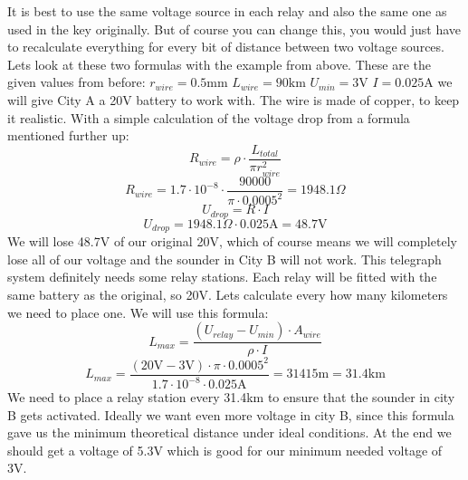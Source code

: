 It is best to use the same voltage source in each relay and also the same one as used in the key originally. But of course you can change this, you would just have to recalculate everything for every bit of distance between two voltage sources.
Lets look at these two formulas with the example from above. These are the given values from before:
$r_{wire} = 0.5\text{mm}$
$L_{wire} = 90\text{km}$
$U_{min} = 3\text{V}$
$I = 0.025 \text{A}$
we will give City A a 20V battery to work with. The wire is made of copper, to keep it realistic.
With a simple calculation of the voltage drop from a formula mentioned further up:
\[
R_{wire} = \rho \cdot \frac{L_{total}}{\pi r_{wire}^2}
\]
\[
R_{wire} = 1.7\cdot 10^{-8} \cdot \frac{90000}{\pi \cdot 0.0005^2} = 1948.1 \Omega 
\]
\[
U_{drop} = R \cdot I
\]
\[
U_{drop} = 1948.1 \Omega \cdot 0.025 \text{A} = 48.7\text{V}
\]
We will lose 48.7V of our original 20V, which of course means we will completely lose all of our voltage and the sounder in City B will not work. This telegraph system definitely needs some relay stations. Each relay will be fitted with the same battery as the original, so 20V. 
Lets calculate every how many kilometers we need to place one. We will use this formula: 
\[
L_{max} = \frac{(U_{relay} - U_{min})\cdot A_{wire}}{\rho \cdot I}
\]
\[
L_{max}=\frac{(20\text{V}-3\text{V})\cdot \pi \cdot 0.0005^2}{1.7\cdot 10^{-8}\cdot 0.025 \text{A}} = 31415 \text{m} = 31.4\text{km}  
\]
We need to place a relay station every 31.4km to ensure that the sounder in city B gets activated. Ideally we want even more voltage in city B, since this formula gave us the minimum theoretical distance under ideal conditions. At the end we should get a voltage of 5.3V which is good for our minimum needed voltage of 3V.

